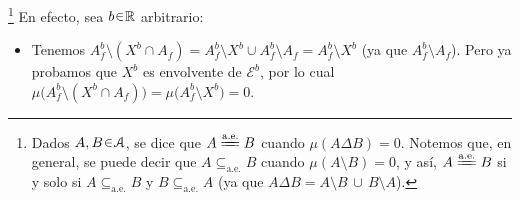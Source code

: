 \begin{sol}
\footnote{
    Dados $A,B\en\mathcal{A}$, se dice que $A \ctpeq B$ cuando $\mu(A \Delta B) = 0$. Notemos que, en general, se puede decir que $A \subseteq_{\text{a.e.}} B$ cuando $\mu(A \setminus B) = 0$, y así, $A \ctpeq B$ si y solo si $A \subseteq_{\text{a.e.}} B$ y $B \subseteq_{\text{a.e.}}A$ (ya que $A \Delta B = A \setminus B \,\cup\, B\setminus A$). 
}
En efecto, sea $b\en\mathbb{R}$ arbitrario:
\begin{itemize}
\item[($\supseteq_{_\text{a.e.}}$)]
Tenemos $A^b_f \setminus (X^b\cap A_f) = A^b_f \setminus X^b \cup A^b_f \setminus A_f = A^b_f \setminus X^b$ (ya que $A^b_f \setminus A_f$). Pero ya probamos que $X^b$ es envolvente de $\mathcal{E}^b$, por lo cual $\mu\bigl(A^b_f \setminus (X^b\cap A_f)\bigr) = \mu\bigl(A^b_f \setminus X^b\bigr) =0$.


\end{itemize}
\end{sol}
